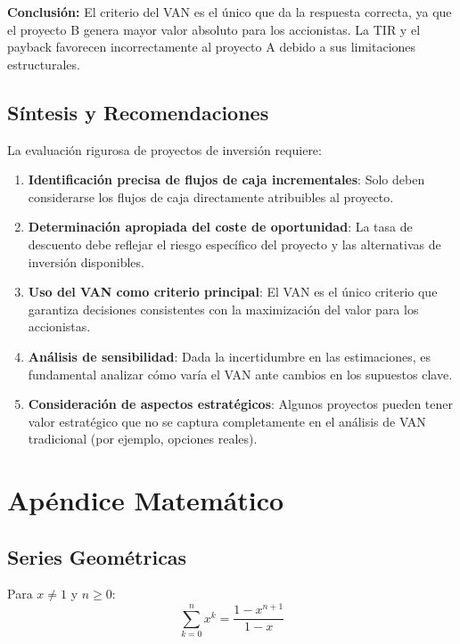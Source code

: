 \begin{ejemplo}
\textbf{Conclusión:} El criterio del VAN es el único que da la respuesta correcta, ya que el proyecto B genera mayor valor absoluto para los accionistas. La TIR y el payback favorecen incorrectamente al proyecto A debido a sus limitaciones estructurales.
\end{ejemplo}

\subsection{Síntesis y Recomendaciones}

La evaluación rigurosa de proyectos de inversión requiere:

\begin{enumerate}
\item \textbf{Identificación precisa de flujos de caja incrementales}: Solo deben considerarse los flujos de caja directamente atribuibles al proyecto.

\item \textbf{Determinación apropiada del coste de oportunidad}: La tasa de descuento debe reflejar el riesgo específico del proyecto y las alternativas de inversión disponibles.

\item \textbf{Uso del VAN como criterio principal}: El VAN es el único criterio que garantiza decisiones consistentes con la maximización del valor para los accionistas.

\item \textbf{Análisis de sensibilidad}: Dada la incertidumbre en las estimaciones, es fundamental analizar cómo varía el VAN ante cambios en los supuestos clave.

\item \textbf{Consideración de aspectos estratégicos}: Algunos proyectos pueden tener valor estratégico que no se captura completamente en el análisis de VAN tradicional (por ejemplo, opciones reales).
\end{enumerate}

\appendix

\section{Apéndice Matemático}

\subsection{Series Geométricas}

\begin{teorema}
Para $x \neq 1$ y $n \geq 0$:
\begin{equation}
\sum_{k=0}^{n} x^k = \frac{1 - x^{n+1}}{1 - x}
\end{equation}
\end{teorema}

